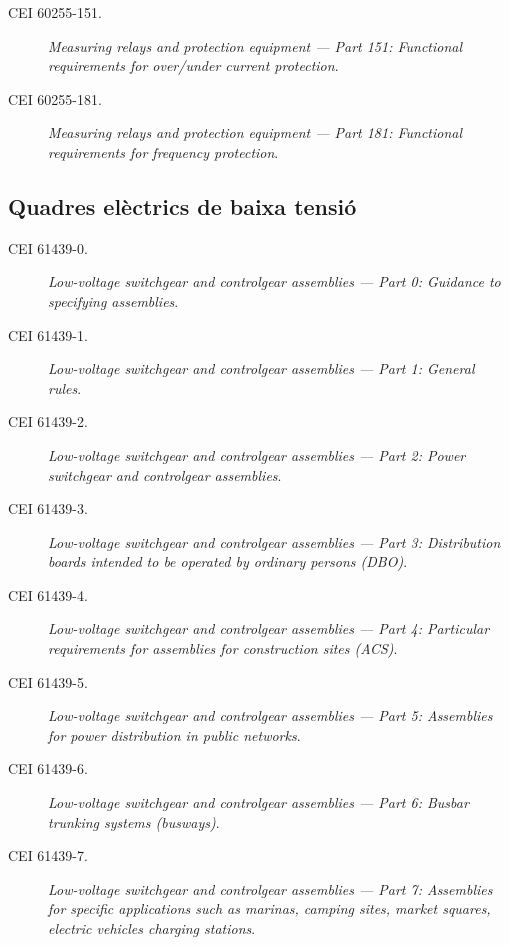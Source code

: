 \begin{description}
    \item [\hspace{5mm}CEI 60255-151.] \textit{Measuring relays and protection equipment --- Part 151:  Functional requirements for over/under current protection}.
    \item [\hspace{5mm}CEI 60255-181.] \textit{Measuring relays and protection equipment --- Part 181: Functional requirements for frequency protection}.   
\end{description}

\subsection*{Quadres elèctrics de baixa tensió}
\begin{description}
    \item [\hspace{5mm}CEI 61439-0.] \textit{Low-voltage switchgear and controlgear assemblies --- Part 0: Guidance to specifying assemblies}.
    \item [\hspace{5mm}CEI 61439-1.] \textit{Low-voltage switchgear and controlgear assemblies --- Part 1: General rules}.
    \item [\hspace{5mm}CEI 61439-2.] \textit{Low-voltage switchgear and controlgear assemblies --- Part 2: Power switchgear and controlgear assemblies}.
    \item [\hspace{5mm}CEI 61439-3.] \textit{Low-voltage switchgear and controlgear assemblies --- Part 3: Distribution boards intended to be operated by ordinary persons (DBO)}.
    \item [\hspace{5mm}CEI 61439-4.] \textit{Low-voltage switchgear and controlgear assemblies --- Part 4: Particular requirements for assemblies for construction sites (ACS)}.
    \item [\hspace{5mm}CEI 61439-5.] \textit{Low-voltage switchgear and controlgear assemblies --- Part 5: Assemblies for power distribution in public networks}.
    \item [\hspace{5mm}CEI 61439-6.] \textit{Low-voltage switchgear and controlgear assemblies --- Part 6: Busbar trunking systems (bus\-ways)}.
    \item [\hspace{5mm}CEI 61439-7.] \textit{Low-voltage switchgear and controlgear assemblies --- Part 7: Assemblies for specific applications such as marinas, camping sites, market squares, electric vehicles charging stations}.
\end{description}


